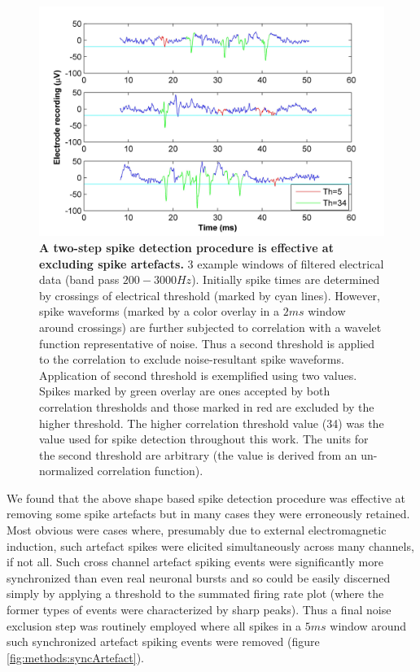 \begin{figure}[!htb]
\centering
\includegraphics[width=15cm]{chapter2/figures/matchFilter/matchFilterIllustration.jpg}
\caption[Examples of spike detection and shape based artefact removal]{\textbf{A two-step spike detection procedure is effective at excluding spike artefacts.} 3 example windows of filtered electrical data (band pass \(200-3000Hz\)). Initially spike times are determined by crossings of electrical threshold (marked by cyan lines). However, spike waveforms (marked by a color overlay in a \(2ms\) window around crossings) are further subjected to correlation with a wavelet function representative of noise. Thus a second threshold is applied to the correlation to exclude noise-resultant spike waveforms. Application of second threshold is exemplified using two values. Spikes marked by green overlay are ones accepted by both correlation thresholds and those marked in red are excluded by the higher threshold. The higher correlation threshold value (34) was the value used for spike detection throughout this work. The units for the second threshold are arbitrary (the value is derived from an un-normalized correlation function).}

\label{fig:methods:matchFilter}

\end{figure}

We found that the above shape based spike detection procedure was effective at removing some spike artefacts but in many cases they were erroneously retained. Most obvious were cases where, presumably due to external electromagnetic induction, such artefact spikes were elicited simultaneously across many channels, if not all. Such cross channel artefact spiking events were significantly more synchronized than even real neuronal bursts and so could be easily discerned simply by applying a threshold to the summated firing rate plot (where the former types of events were characterized by sharp peaks). Thus a final noise exclusion step was routinely employed where all spikes in a \(5ms\) window around such synchronized artefact spiking events were removed (figure \ref{fig:methods:syncArtefact}).

